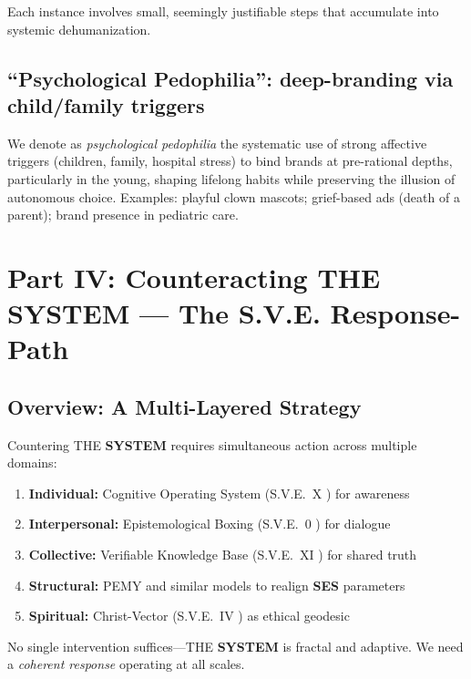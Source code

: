 \documentclass[11pt,a4paper]{article}
\newcommand{\SYSTEM}{\textbf{SYSTEM}}
\newcommand{\SES}{\textbf{SES}}
\theoremstyle{definition}
\theoremstyle{remark}
\begin{document}
Each instance involves small, seemingly justifiable steps that accumulate into systemic dehumanization.

\subsection{``Psychological Pedophilia'': deep-branding via child/family triggers}
\label{subsec:psy_pedophilia}

We denote as \emph{psychological pedophilia} the systematic use of strong affective triggers (children, family, hospital stress) to bind brands at pre-rational depths, particularly in the young, shaping lifelong habits while preserving the illusion of autonomous choice. Examples: playful clown mascots; grief-based ads (death of a parent); brand presence in pediatric care. %


\newpage

\section{Part IV: Counteracting THE \SYSTEM{} --- The S.V.E. Response-Path}

\subsection{Overview: A Multi-Layered Strategy}

Countering THE \SYSTEM{} requires simultaneous action across multiple domains:

\begin{enumerate}
    \item \textbf{Individual:} Cognitive Operating System (S.V.E.~X \cite{sve10}) for awareness
    \item \textbf{Interpersonal:} Epistemological Boxing (S.V.E.~0 \cite{sve0}) for dialogue
    \item \textbf{Collective:} Verifiable Knowledge Base (S.V.E.~XI \cite{sve11}) for shared truth
    \item \textbf{Structural:} PEMY and similar models to realign \SES{} parameters
    \item \textbf{Spiritual:} Christ-Vector (S.V.E.~IV \cite{sve4}) as ethical geodesic
\end{enumerate}

No single intervention suffices---THE \SYSTEM{} is fractal and adaptive. We need a \textit{coherent response} operating at all scales.
\end{document}
